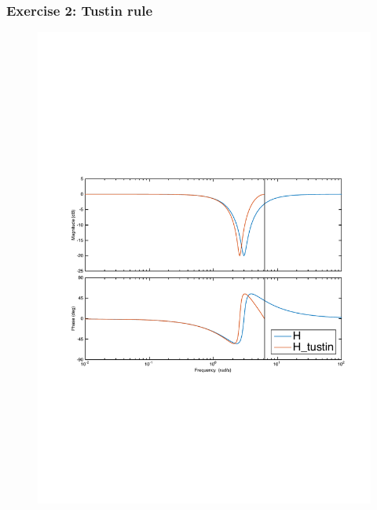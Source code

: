 \begin{frame}
	\frametitle{Exercise 2: Tustin rule}
	\vspace{-0.7em}
	\begin{figure}
		\centering
		\includegraphics[width=0.9\linewidth]{distortion_bode2}
	\end{figure}
\end{frame}

